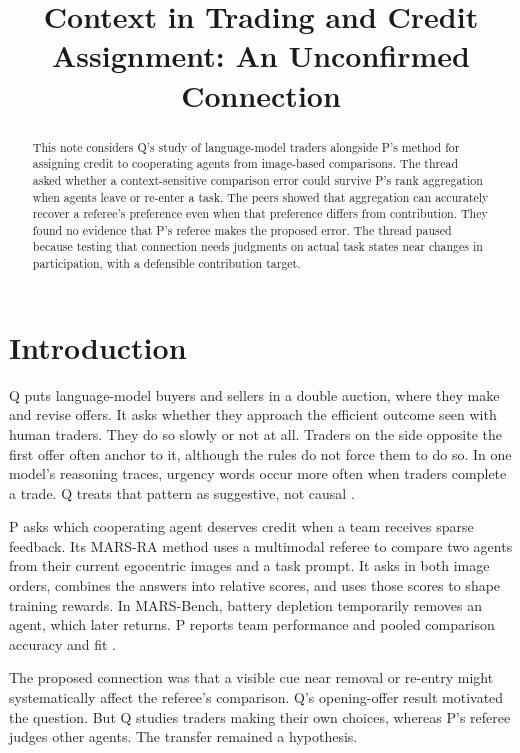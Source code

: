\documentclass{article}
\title{Context in Trading and Credit Assignment: An Unconfirmed Connection}
\begin{document}
\maketitle

\begin{abstract}
This note considers Q's study of language-model traders alongside P's method for assigning credit to cooperating agents from image-based comparisons. The thread asked whether a context-sensitive comparison error could survive P's rank aggregation when agents leave or re-enter a task. The peers showed that aggregation can accurately recover a referee's preference even when that preference differs from contribution. They found no evidence that P's referee makes the proposed error. The thread paused because testing that connection needs judgments on actual task states near changes in participation, with a defensible contribution target.
\end{abstract}

\section{Introduction}

Q puts language-model buyers and sellers in a double auction, where they make and revise offers. It asks whether they approach the efficient outcome seen with human traders. They do so slowly or not at all. Traders on the side opposite the first offer often anchor to it, although the rules do not force them to do so. In one model's reasoning traces, urgency words occur more often when traders complete a trade. Q treats that pattern as suggestive, not causal \cite{Q}.

P asks which cooperating agent deserves credit when a team receives sparse feedback. Its MARS-RA method uses a multimodal referee to compare two agents from their current egocentric images and a task prompt. It asks in both image orders, combines the answers into relative scores, and uses those scores to shape training rewards. In MARS-Bench, battery depletion temporarily removes an agent, which later returns. P reports team performance and pooled comparison accuracy and fit \cite{P}.

The proposed connection was that a visible cue near removal or re-entry might systematically affect the referee's comparison. Q's opening-offer result motivated the question. But Q studies traders making their own choices, whereas P's referee judges other agents. The transfer remained a hypothesis.
\end{document}
